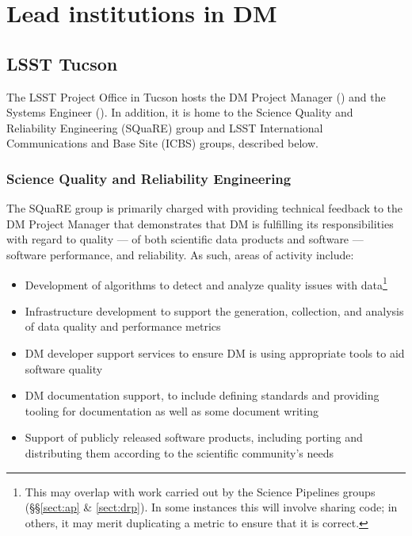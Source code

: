 \section{Lead institutions in \gls{DM} \label{sect:leadtutes}}

\subsection{LSST Tucson\label{sect:tucson}}

The \gls{LSST} Project Office in Tucson hosts the \gls{DM} \gls{Project Manager} () and the \gls{Systems Engineer} ().
In addition, it is home to the Science Quality and Reliability Engineering (\gls{SQuaRE}) group and \gls{LSST} International Communications and Base Site (\gls{ICBS}) groups, described below.

\subsubsection{Science Quality and Reliability Engineering \label{sect:square}}

The \gls{SQuaRE} group is primarily charged with providing technical feedback to the \gls{DM} \gls{Project Manager} that demonstrates that \gls{DM} is fulfilling its responsibilities with regard to quality — of both scientific data products and software — software performance, and reliability. As such, areas of activity include:

\begin{itemize}

\item Development of algorithms to detect and analyze quality issues with data\footnote{This may overlap with work carried out by the \gls{Science Pipelines} groups (\S\S\ref{sect:ap} \& \ref{sect:drp}). In some instances this will involve sharing code; in others, it may merit duplicating a \gls{metric} to ensure that it is correct.}

\item Infrastructure development to support the generation, collection, and analysis of data quality and performance metrics

\item \gls{DM} developer support services to ensure \gls{DM} is using appropriate tools to aid software quality

\item \gls{DM} documentation support, to include defining standards and providing tooling for documentation as well as some document writing

\item Support of publicly released software products, including porting and distributing them according to the scientific community's needs

\end{itemize}

